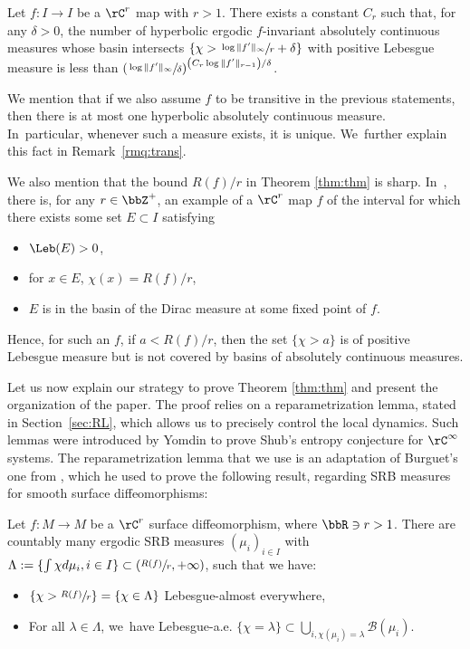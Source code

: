 \begin{proptitle}
\label{prop:title}
Let $f : I \to I$ be a $\rC^r$ map with $r > 1$.
There exists a constant $C_r$ such that, for any $\delta > 0$, the number of hyperbolic ergodic $f$\nobreakdash-invariant absolutely continuous measures whose basin intersects $\left \{ \chi > \sfrac{\log \| f' \|_{\infty}}{r} + \delta \right \}$
with positive Lebesgue measure is less than
$
\left (\sfrac{\log \| f' \|_{\infty}}{\delta} \right)^{\left (C_r \log \| f' \|_{r-1} \right) / \delta}
$.
\end{proptitle}

We mention that if we also assume $f$ to be transitive in the previous statements, then there is at most one hyperbolic absolutely continuous measure. In~particular, whenever such a measure exists, it is unique. We~further explain this fact in Remark~\ref{rmq:trans}.

We also mention that the bound $R(f) /r$ in Theorem \ref{thm:thm} is sharp. In~\cite[App.\,A]{BurguetCMP}, there is, for any $r \in \bbZ^+$, an example of a $\rC^r$ map $f$ of the interval for which there exists some set $E \subset I$ satisfying
\begin{itemize}
\item
$\Leb(E) > 0$,
\item
for $x \in E$, $\chi(x) = R(f) / r$,
\item
$E$ is in the basin of the Dirac measure at some fixed point of $f$.
\end{itemize}
Hence, for such an $f$, if $a < R(f) / r$, then the set $\{ \chi > a \}$ is of positive Lebesgue measure but is not covered by basins of absolutely continuous measures.

Let us now explain our strategy to prove Theorem \ref{thm:thm} and present the organization of the paper.
The proof relies on a reparametrization lemma, stated in Section~\ref{sec:RL}, which allows us to precisely control the local dynamics.
Such lemmas were introduced by Yomdin \cite{Yomdin1987VolumeGA} to prove Shub's entropy conjecture for $\rC^{\infty}$ systems.
The reparametrization lemma that we use is an adaptation of Burguet's one from \cite{MR4701884}, which he used to prove the following result, regarding SRB measures for smooth surface diffeomorphisms:

\begin{thm*}
Let $f: M \to M$ be a $\rC^r$ surface diffeomorphism, where $\bbR \ni r > 1$.
There are countably many ergodic SRB measures $(\mu_i)_{i \in I}$ with $\Lambda := \{ \int \chi d \mu_i, i \in I \} \subset \left (\sfrac{R(f)}{r}, + \infty \right)$, such that we have:
\begin{itemize}
\item
$\left \{ \chi > \sfrac{R(f)}{r} \right \} = \{ \chi \in \Lambda \}$ Lebesgue-almost everywhere,
\item
For all $\lambda \in \Lambda$, we~have Lebesgue-a.e. $\{ \chi = \lambda \} \subset \bigcup_{i, \chi(\mu_i) = \lambda} \mathcal{B}(\mu_i)$.
\end{itemize}
\end{thm*}

